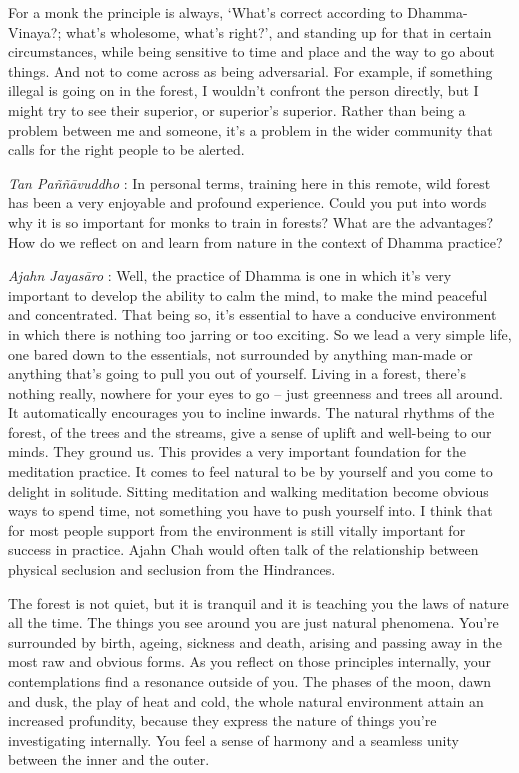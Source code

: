 For a monk the principle is always, `What's correct according to
Dhamma-Vinaya?; what's wholesome, what's right?', and standing up for
that in certain circumstances, while being sensitive to time and place
and the way to go about things. And not to come across as being
adversarial. For example, if something illegal is going on in the
forest, I wouldn't confront the person directly, but I might try to see
their superior, or superior's superior. Rather than being a problem
between me and someone, it's a problem in the wider community that calls
for the right people to be alerted.

\emph{Tan Paññāvuddho} : In personal terms, training here in this
remote, wild forest has been a very enjoyable and profound experience.
Could you put into words why it is so important for monks to train in
forests? What are the advantages? How do we reflect on and learn from
nature in the context of Dhamma practice?

\emph{Ajahn Jayasāro }: Well, the practice of Dhamma is one in which
it's very important to develop the ability to calm the mind, to make the
mind peaceful and concentrated. That being so, it's essential to have a
conducive environment in which there is nothing too jarring or too
exciting. So we lead a very simple life, one bared down to the
essentials, not surrounded by anything man-made or anything that's going
to pull you out of yourself. Living in a forest, there's nothing really,
nowhere for your eyes to go -- just greenness and trees all around. It
automatically encourages you to incline inwards. The natural rhythms of
the forest, of the trees and the streams, give a sense of uplift and
well-being to our minds. They ground us. This provides a very important
foundation for the meditation practice. It comes to feel natural to be
by yourself and you come to delight in solitude. Sitting meditation and
walking meditation become obvious ways to spend time, not something you
have to push yourself into. I think that for most people support from
the environment is still vitally important for success in practice.
Ajahn Chah would often talk of the relationship between physical
seclusion and seclusion from the Hindrances.

The forest is not quiet, but it is tranquil and it is teaching you the
laws of nature all the time. The things you see around you are just
natural phenomena. You're surrounded by birth, ageing, sickness and
death, arising and passing away in the most raw and obvious forms. As
you reflect on those principles internally, your contemplations find a
resonance outside of you. The phases of the moon, dawn and dusk, the
play of heat and cold, the whole natural environment attain an increased
profundity, because they express the nature of things you're
investigating internally. You feel a sense of harmony and a seamless
unity between the inner and the outer.


